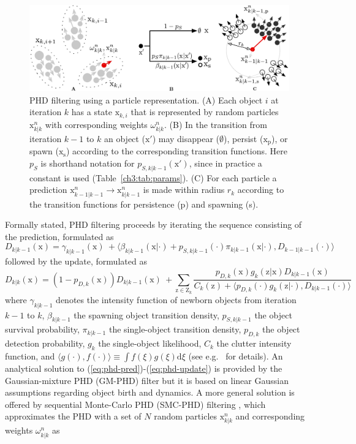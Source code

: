 \begin{figure}
	\centering
	\includegraphics[width=.9\linewidth]{fig2}
	\caption{PHD filtering using a particle representation. (A) Each object $i$ at iteration $k$ has a state $\mathrm{x}_{k,i}$ that is represented by random particles $\mathrm{x}_{k|k}^{n}$ with corresponding weights $\omega_{k|k}^{n}$. (B) In the transition from iteration $k-1$ to $k$ an object ($\mathrm{x}'$) may disappear ($\emptyset$), persist ($\mathrm{x}_{\mathrm{p}}$), or spawn ($\mathrm{x}_{\mathrm{s}}$) according to the corresponding transition functions. Here $p_S$ is shorthand notation for $p_{S,k|k-1}(\mathrm{x}')$, since in practice a constant is used (Table~\ref{ch3:tab:params}). (C) For each particle a prediction $\mathrm{x}_{k-1|k-1}^n \rightarrow \mathrm{x}_{k|k-1}^n$ is made within radius $r_k$ according to the transition functions for persistence (p) and spawning (s).}
	\label{ch3_fig2}
\end{figure}
Formally stated, PHD filtering proceeds by iterating the sequence consisting of the prediction, formulated as
\begin{equation}
D_{k|k-1}(\mathrm{x}) = \gamma_{k|k-1}(\mathrm{x})\ + 
\langle \beta_{k|k-1}(\mathrm{x}|\cdot) + p_{S,k|k-1}(\cdot)\pi_{k|k-1}(\mathrm{x}|\cdot),D_{k-1|k-1}(\cdot) \rangle
\label{eq:phd-pred}
\end{equation}
followed by the update, formulated as
\begin{equation}
D_{k|k}(\mathrm{x}) = (1-p_{D,k}(\mathrm{x})) D_{k|k-1}(\mathrm{x})\ +
\sum\limits_{\mathrm{z}\in\mathrm{Z}_k}\!\frac{p_{D,k}(\mathrm{x})g_k(\mathrm{z}|\mathrm{x}) D_{k|k-1}(\mathrm{x}) }{C_k(\mathrm{z})+\langle p_{D,k}(\cdot)g_k(\mathrm{z}|\cdot),D_{k|k-1}(\cdot) \rangle}
\label{eq:phd-update}
\end{equation}
where $\gamma_{k|k-1}$ denotes the intensity function of newborn objects from iteration $k-1$ to $k$, $\beta_{k|k-1}$ the spawning object transition density, $p_{S,k|k-1}$ the object survival probability, $\pi_{k|k-1}$ the single-object transition density, $p_{D,k}$ the object detection probability, $g_k$ the single-object likelihood, $C_k$ the clutter intensity function, and $\langle g(\cdot),f(\cdot) \rangle \equiv \int\!f(\xi)g(\xi)\mathrm{d}\xi$ (see e.g.\ \cite{vo2006gaussian} for details). An analytical solution to (\ref{eq:phd-pred})-(\ref{eq:phd-update}) is provided by the Gaussian-mixture PHD (GM-PHD) filter \cite{vo2006gaussian} but it is based on linear Gaussian assumptions regarding object birth and dynamics. A more general solution is offered by sequential Monte-Carlo PHD (SMC-PHD) filtering \cite{vo2005sequential, ristic2010improved, zajic2003particle}, which approximates the PHD with a set of $N$ random particles $\mathrm{x}_{k|k}^{n}$ and corresponding weights $\omega_{k|k}^{n}$ as
